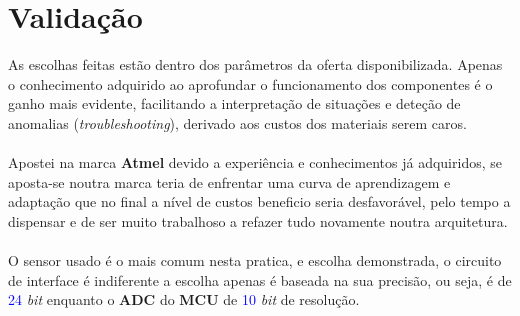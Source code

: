 \section{Validação}
As escolhas feitas estão dentro dos parâmetros da oferta disponibilizada. Apenas o conhecimento adquirido ao aprofundar o funcionamento dos componentes é o ganho mais evidente, facilitando a interpretação de situações e deteção de anomalias (\textit{troubleshooting}), derivado aos custos dos materiais serem caros.
\\
\\
Apostei na marca \textbf{Atmel} devido a experiência e conhecimentos já adquiridos, se aposta-se noutra marca teria de enfrentar uma curva de aprendizagem e adaptação que no final a nível de custos beneficio seria desfavorável, pelo tempo a dispensar e de ser muito trabalhoso a refazer tudo novamente noutra arquitetura.
\\
\\
O sensor usado é o mais comum nesta pratica, e escolha demonstrada, o circuito de interface é indiferente a escolha apenas é baseada na sua precisão, ou seja, é de \textcolor{blue}{24} \textit{bit} enquanto o \textbf{ADC} do \textbf{MCU} de \textcolor{blue}{10} \textit{bit} de resolução.
\\
\\
